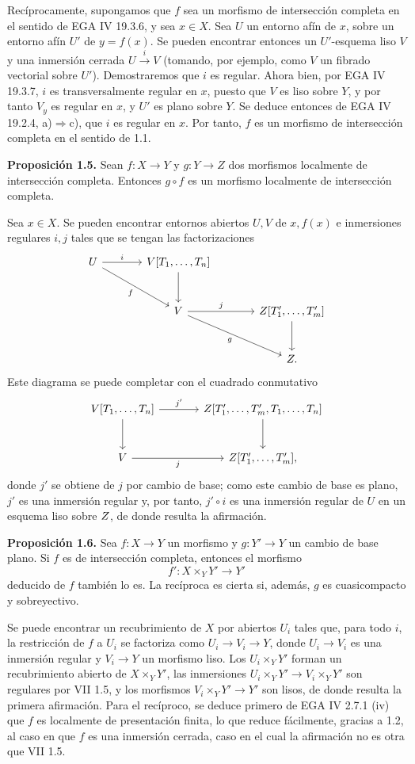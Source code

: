 Recíprocamente, supongamos que $f$ sea un morfismo de intersección completa
en el sentido de EGA IV 19.3.6, y sea $x\in X$. Sea $U$ un entorno afín de
$x$, sobre un entorno afín $U'$ de $y=f(x)$. Se pueden encontrar entonces un
$U'$-esquema liso $V$ y una inmersión cerrada $U\xrightarrow{i}V$ (tomando,
por ejemplo, como $V$ un fibrado vectorial sobre $U'$). Demostraremos que $i$
es regular. Ahora bien, por EGA IV 19.3.7, $i$ es transversalmente regular en
$x$, puesto que $V$ es liso sobre $Y$, y por tanto $V_y$ es regular en $x$, y
$U'$ es plano sobre $Y$. Se deduce entonces de EGA IV 19.2.4,
a)$\Rightarrow$c), que $i$ es regular en $x$. Por tanto, $f$ es un morfismo de
intersección completa en el sentido de 1.1.

\textbf{Proposición 1.5.} Sean $f:X\to Y$ y $g:Y\to Z$ dos morfismos
localmente de intersección completa. Entonces $g\circ f$ es un morfismo
localmente de intersección completa.

Sea $x\in X$. Se pueden encontrar entornos abiertos $U,V$ de $x,f(x)$ e
inmersiones regulares $i,j$ tales que se tengan las factorizaciones
\[
\begin{tikzcd}[column sep=large,row sep=large]
U \arrow[r,"i"] \arrow[dr,"f"'] & V[T_1,\ldots,T_n] \arrow[d] &\\
& V \arrow[r,"j"] \arrow[dr,"g"'] & Z[T'_1,\ldots,T'_m] \arrow[d]\\
& & Z .
\end{tikzcd}
\]
Este diagrama se puede completar con el cuadrado conmutativo
\[
\begin{tikzcd}[column sep=large,row sep=large]
V[T_1,\ldots,T_n] \arrow[r,"j'"] \arrow[d] & Z[T'_1,\ldots,T'_m,T_1,\ldots,T_n] \arrow[d]\\
V \arrow[r,"j"'] & Z[T'_1,\ldots,T'_m],
\end{tikzcd}
\]
donde $j'$ se obtiene de $j$ por cambio de base; como este cambio de base es
plano, $j'$ es una inmersión regular y, por tanto, $j'\circ i$ es una
inmersión regular de $U$ en un esquema liso sobre $\sisi{W}{Z}$, de donde resulta la %
afirmación.

\textbf{Proposición 1.6.} Sea $f:X\to Y$ un morfismo y $g:Y'\to Y$ un cambio
de base plano. Si $f$ es de intersección completa, entonces el morfismo
\[
f':X\times_Y Y'\to Y'
\]
deducido de $f$ también lo es. La recíproca es cierta si, además, $g$ es
cuasicompacto y sobreyectivo.

Se puede encontrar un recubrimiento de $X$ por abiertos $U_i$ tales que, para
todo $i$, la restricción de $f$ a $U_i$ se factoriza como
$U_i\longrightarrow V_i\longrightarrow Y$, donde $U_i\to V_i$ es una
inmersión regular y $V_i\to Y$ un morfismo liso. Los $U_i\times_Y Y'$ forman
un recubrimiento abierto de $X\times_Y Y'$, las inmersiones
$U_i\times_Y Y'\longrightarrow V_i\times_Y Y'$ son regulares por VII 1.5, y
los morfismos $V_i\times_Y Y'\to Y'$ son lisos, de donde resulta la primera
afirmación. Para el recíproco, se deduce primero de EGA IV 2.7.1 (iv) que $f$
es localmente de presentación finita, lo que reduce fácilmente, gracias a 1.2,
al caso en que $f$ es una inmersión cerrada, caso en el cual la afirmación no
es otra que VII 1.5.

